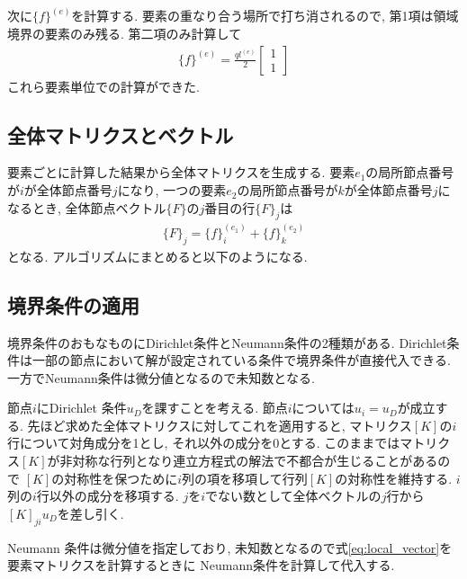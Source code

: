 \documentclass[paper=a4]{jlreq}
\begin{document}
次に$\{f\}^{(e)}$を計算する.
要素の重なり合う場所で打ち消されるので, 第1項は領域境界の要素のみ残る.
第二項のみ計算して
\begin{align}
    \{f\}^{(e)} = \frac{ql^{(e)}}{2}
    \begin{bmatrix}
        1 \\
        1
    \end{bmatrix}
\end{align}
これら要素単位での計算ができた.

\subsection{全体マトリクスとベクトル}
要素ごとに計算した結果から全体マトリクスを生成する.
要素$e_1$の局所節点番号が$i$が全体節点番号$j$になり,
一つの要素$e_2$の局所節点番号が$k$が全体節点番号$j$になるとき,
全体節点ベクトル$\{F\}$の$j$番目の行$\{F\}_j$は
\begin{align}
    \{F\}_j = \{f\}^{(e_1)}_i +  \{f\}^{(e_2)}_k 
\end{align}
となる. アルゴリズムにまとめると以下のようになる. 

\subsection{境界条件の適用}
境界条件のおもなものにDirichlet条件とNeumann条件の2種類がある.
Dirichlet条件は一部の節点において解が設定されている条件で境界条件が直接代入できる.
一方でNeumann条件は微分値となるので未知数となる. 

節点$i$にDirichlet 条件$u_D$を課すことを考える.
節点$i$については$u_i =u_D$が成立する. 先ほど求めた全体マトリクスに対してこれを適用すると,
マトリクス$[K]$の$i$行について対角成分を1とし, それ以外の成分を0とする.
このままではマトリクス$[K]$が非対称な行列となり連立方程式の解法で不都合が生じることがあるので
$[K]$の対称性を保つために$i$列の項を移項して行列$[K]$の対称性を維持する.
$i$列の$i$行以外の成分を移項する. 
$j$を$i$でない数として全体ベクトルの$j$行から$[K]_{ji}u_D$を差し引く.

Neumann 条件は微分値を指定しており, 
未知数となるので式\eqref{eq:local_vector}を要素マトリクスを計算するときに
Neumann条件を計算して代入する.
\end{document}
